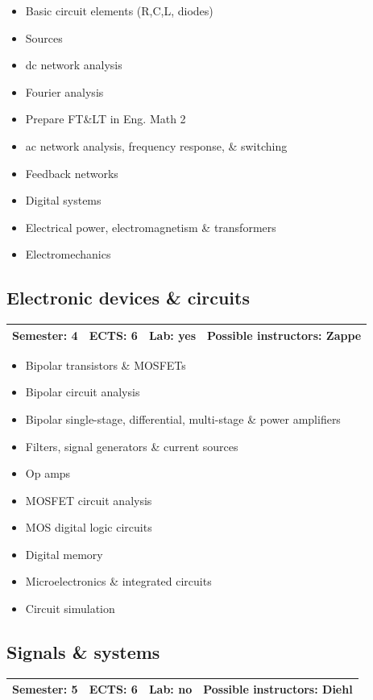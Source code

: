 \documentclass[12pt,twoside,fleqn,a4paper]{article}
\newcommand{\lp}[1]{{\color{red} #1}}  %
\begin{document}
\begin{itemize}
\setlength\itemsep{0cm}
\item Basic circuit elements (R,C,L, diodes)
\item Sources
\item dc network analysis
\item Fourier analysis
\item \lp{Prepare FT\&LT in Eng. Math 2}
\item ac network analysis, frequency response, \& switching
\item Feedback networks
\item Digital systems
\item Electrical power, electromagnetism \& transformers
\item Electromechanics
\end{itemize}


\subsection{Electronic devices \& circuits}
\begin{tabular}{llll} \hline
\textbf{Semester:} 4 & \textbf{ECTS:} 6 & \textbf{Lab:} yes & \textbf{Possible instructors:} Zappe\\
\hline
\end{tabular}

\begin{itemize}
\setlength\itemsep{0cm}
\item Bipolar transistors \& MOSFETs
\item Bipolar circuit analysis
\item Bipolar single-stage, differential, multi-stage \& power amplifiers
\item Filters, signal generators \& current sources
\item Op amps
\item MOSFET circuit analysis
\item MOS digital logic circuits
\item Digital memory
\item Microelectronics \& integrated circuits
\item Circuit simulation
\end{itemize}


\subsection{Signals \& systems}
\begin{tabular}{llll} \hline
\textbf{Semester:} 5 & \textbf{ECTS:} 6 & \textbf{Lab:} no & \textbf{Possible instructors:} Diehl\\
\hline
\end{tabular}
\end{document}
